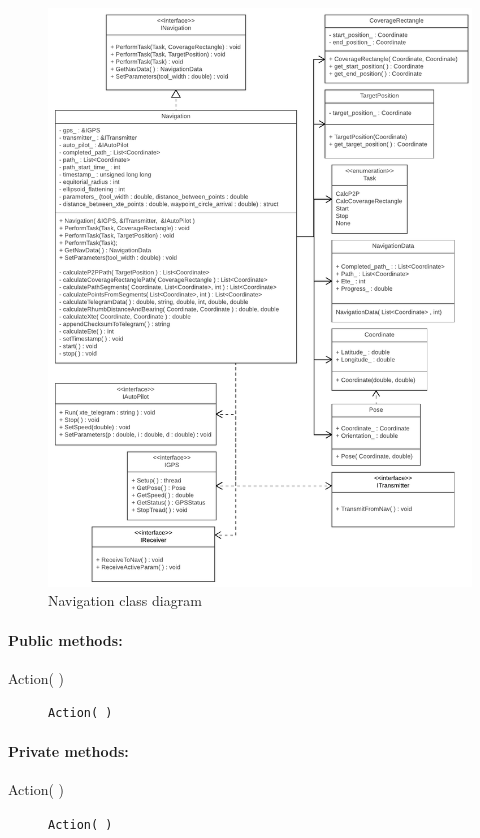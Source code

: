 \begin{figure}[H]
\centering
\includegraphics[width=1.2\linewidth]{Images/Design/Navigation_class_diagram}
\caption{Navigation class diagram}
\label{fig:Navigation}
\end{figure}

\paragraph{Public methods:}
\begin{adjustwidth}{2.5em}{0pt}\begin{description}
		\item [Action( )] \texttt{Action( )}
\end{description}\end{adjustwidth}

\paragraph{Private methods:}
\begin{adjustwidth}{2.5em}{0pt}\begin{description}
		\item [Action( )] \texttt{Action( )}
\end{description}\end{adjustwidth}

